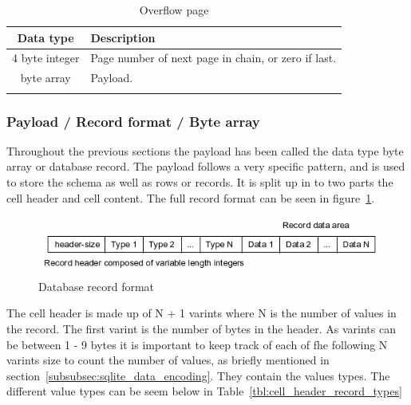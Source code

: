 \begin{longtable}[h]{| c | p{5cm} |}
		\hline
			\textbf{Data type} & \textbf{Description} \\ 
		\hline
		\endhead
			4 byte integer & Page number of next page in chain, or zero if last. \\
		\hline
			byte array & Payload. \\
		\hline
	\caption{Overflow page}
	\label{tbl:overflow_page}
\end{longtable}

\subsubsection{Payload / Record format / Byte array}
\label{subsubsec:record_format}

Throughout the previous sections the payload has been called the data type byte array or database record. The payload follows a very specific pattern, and is used to store the schema as well as rows or records. It is split up in to two parts the cell header and cell content. The full record format can be seen in figure~\ref{fig:sqlite_record_format}.

\begin{figure}[H]
	\centering
	\includegraphics[scale=0.7]{images/recordformat.png}
	\caption{Database record format \citep{sqliteray}}
	\label{fig:sqlite_record_format}
\end{figure}

The cell header is made up of N + 1 varints where N is the number of values in the record. The first varint is the number of bytes in the header. As varints can be between 1 - 9 bytes it is important to keep track of each of fhe following N varints size to count the number of values, as briefly mentioned in section~\ref{subsubsec:sqlite_data_encoding}. They contain the values types. The different value types can be seem below in Table~\ref{tbl:cell_header_record_types} 

